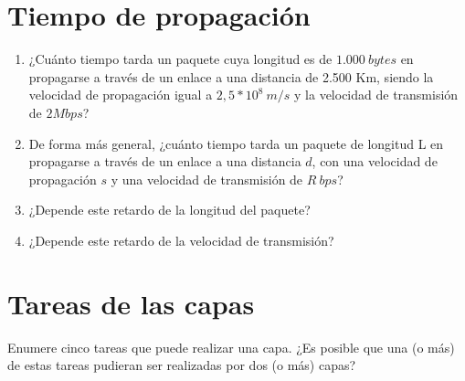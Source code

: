 \documentclass[12pt]{report}
\begin{document}
\section{Tiempo de propagación \sfour}

\begin{enumerate}
\item ¿Cuánto tiempo tarda un paquete cuya longitud es de $1.000\ bytes$ en propagarse a través de un enlace a una distancia de 2.500 Km, siendo la velocidad de propagación igual a $ 2,5 * 10^{8}\ m/s $ y la velocidad de transmisión de $2 Mbps$?
\item De forma más general, ¿cuánto tiempo tarda un paquete de longitud L en propagarse a través de un enlace a una distancia $d$, con una velocidad de propagación $s$ y una velocidad de transmisión de $R\ bps$?
\item ¿Depende este retardo de la longitud del paquete?
\item ¿Depende este retardo de la velocidad de transmisión?
\end{enumerate}

\section{Tareas de las capas \stwo}
Enumere cinco tareas que puede realizar una capa. ¿Es posible que una (o más) de estas tareas pudieran ser realizadas por dos (o más) capas?
\end{document}
